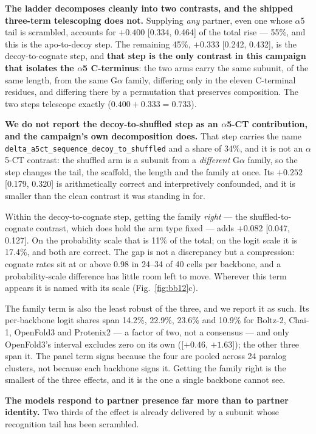 \textbf{The ladder decomposes cleanly into two contrasts, and the shipped
three-term telescoping does not.} Supplying \emph{any} partner, even one whose
$\alpha$5 tail is scrambled, accounts for $+0.400$ [0.334, 0.464] of the total
rise --- 55\%, and this is the apo-to-decoy step. The remaining 45\%,
$+0.333$ [0.242, 0.432], is the decoy-to-cognate step, and \textbf{that step is
the only contrast in this campaign that isolates the $\alpha$5 C-terminus}: the
two arms carry the same subunit, of the same length, from the same G$\alpha$
family, differing only in the eleven C-terminal residues, and differing there by
a permutation that preserves composition. The two steps telescope exactly
($0.400 + 0.333 = 0.733$).

\textbf{We do not report the decoy-to-shuffled step as an $\alpha$5-CT
contribution, and the campaign's own decomposition does.} That step carries the
name \texttt{delta\_a5ct\_sequence\_decoy\_to\_shuffled} and a share of 34\%,
and it is not an $\alpha$5-CT contrast: the shuffled arm is a subunit from a
\emph{different} G$\alpha$ family, so the step changes the tail, the scaffold,
the length and the family at once. Its $+0.252$ [0.179, 0.320] is arithmetically
correct and interpretively confounded, and it is smaller than the clean contrast
it was standing in for.

Within the decoy-to-cognate step, getting the family \emph{right} --- the
shuffled-to-cognate contrast, which does hold the arm type fixed --- adds
$+0.082$ [0.047, 0.127]. On the probability scale that is 11\% of the total; on
the logit scale it is 17.4\%, and both are correct. The gap is not a discrepancy
but a compression: cognate rates sit at or above 0.98 in 24--34 of 40 cells per
backbone, and a probability-scale difference has little room left to move.
Wherever this term appears it is named with its scale
(Fig.~\ref{fig:bb12}c).

The family term is also the least robust of the three, and we report it as such.
Its per-backbone logit shares span 14.2\%, 22.9\%, 23.6\% and 10.9\% for
Boltz-2, Chai-1, OpenFold3 and Protenix2 --- a factor of two, not a consensus
--- and only OpenFold3's interval excludes zero on its own
([$+0.46$, $+1.63$]); the other three span it. The panel term signs because the
four are pooled across 24 paralog clusters, not because each backbone signs it.
Getting the family right is the smallest of the three effects, and it is the one
a single backbone cannot see.

\textbf{The models respond to partner presence far more than to partner
identity.} Two thirds of the effect is already delivered by a subunit whose
recognition tail has been scrambled.

